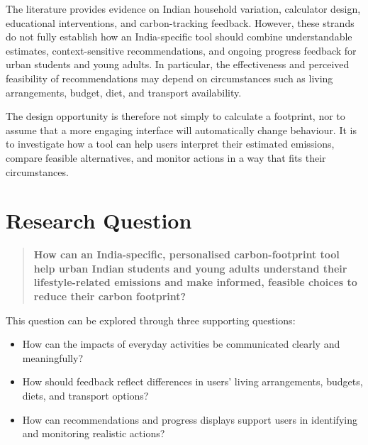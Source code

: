 \documentclass[10pt,a4paper,twocolumn]{article}
\begin{document}
The literature provides evidence on Indian household variation, calculator design, educational interventions, and carbon-tracking feedback. However, these strands do not fully establish how an India-specific tool should combine understandable estimates, context-sensitive recommendations, and ongoing progress feedback for urban students and young adults. In particular, the effectiveness and perceived feasibility of recommendations may depend on circumstances such as living arrangements, budget, diet, and transport availability.

The design opportunity is therefore not simply to calculate a footprint, nor to assume that a more engaging interface will automatically change behaviour. It is to investigate how a tool can help users interpret their estimated emissions, compare feasible alternatives, and monitor actions in a way that fits their circumstances.

\section{Research Question}
\begin{quote}
\small
\textbf{How can an India-specific, personalised carbon-footprint tool help urban Indian students and young adults understand their lifestyle-related emissions and make informed, feasible choices to reduce their carbon footprint?}
\end{quote}

This question can be explored through three supporting questions:
\begin{itemize}
    \item How can the impacts of everyday activities be communicated clearly and meaningfully?
    \item How should feedback reflect differences in users' living arrangements, budgets, diets, and transport options?
    \item How can recommendations and progress displays support users in identifying and monitoring realistic actions?
\end{itemize}
\end{document}
